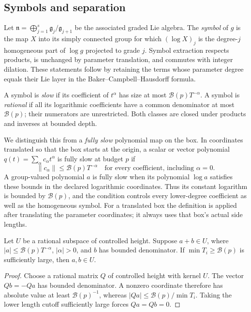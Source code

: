\subsection{Symbols and separation}

Let $\mathfrak n=\bigoplus_{j=1}^s\mathfrak g_j/\mathfrak g_{j+1}$
be the associated graded Lie algebra.  The \emph{symbol} of $g$ is the
map $X$ into its simply connected group for which $(\log X)_j$ is the
degree-$j$ homogeneous part of $\log g$ projected to grade $j$.
Symbol extraction respects products, is unchanged by parameter
translation, and commutes with integer dilation.  These statements
follow by retaining the terms whose parameter degree equals their
Lie layer in the Baker--Campbell--Hausdorff formula.

A symbol is \emph{slow} if its coefficient of $t^\alpha$ has size at
most $\mathcal B(p)T^{-\alpha}$.  A symbol is \emph{rational} if all
its logarithmic coefficients have a common denominator at most
$\mathcal B(p)$; their numerators are unrestricted.  Both classes
are closed under products and inverses at bounded depth.

We distinguish this from a \emph{fully slow} polynomial map on the
box.  In coordinates translated so that the box starts at the
origin, a scalar or vector polynomial $q(t)=\sum_\alpha c_\alpha
t^\alpha$ is fully slow at budget $p$ if
\[
 \|c_\alpha\|\leq\mathcal B(p)T^{-\alpha}
 \quad\text{for every coefficient, including }\alpha=0.
\]
A group-valued polynomial $a$ is fully slow when its polynomial
$\log a$ satisfies these bounds in the declared logarithmic
coordinates.  Thus its constant logarithm is bounded by
$\mathcal B(p)$, and the condition controls every lower-degree
coefficient as well as the homogeneous symbol.  For a translated
box the definition is applied after translating the parameter
coordinates; it always uses that box's actual side lengths.

\begin{lemma}[Separation]\label{prelim:separation}
Let $U$ be a rational subspace of controlled height.  Suppose $a+b\in U$,
where $|a|\leq\mathcal B(p)T^{-\alpha}$, $|\alpha|>0$, and $b$ has
bounded denominator.  If $\min T_i\geq\mathcal B(p)$ is sufficiently
large, then $a,b\in U$.
\end{lemma}

\begin{proof}
Choose a rational matrix $Q$ of controlled height with kernel $U$.
The vector $Qb=-Qa$ has bounded denominator.  A nonzero coordinate
therefore has absolute value at least $\mathcal B(p)^{-1}$, whereas
$|Qa|\leq\mathcal B(p)/\min T_i$.  Taking the lower length cutoff
sufficiently large forces $Qa=Qb=0$.
\end{proof}

